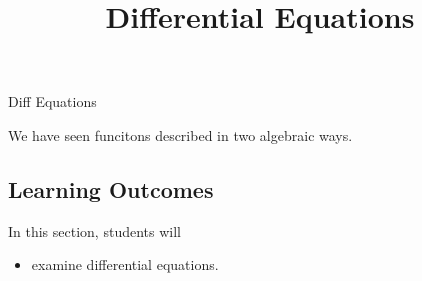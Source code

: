 \documentclass{ximera}
\title{Differential Equations}
\begin{document}
\begin{abstract}
\end{abstract}
\maketitle


Diff Equations


We have seen funcitons described in two algebraic ways.









\subsection{Learning Outcomes}


\begin{sectionOutcomes}
In this section, students will 

\begin{itemize}
\item examine differential equations.
\end{itemize}
\end{sectionOutcomes}
\end{document}
